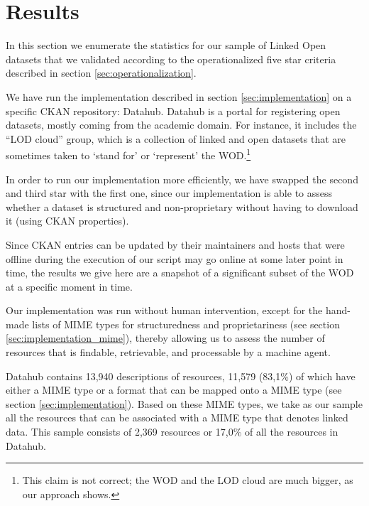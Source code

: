 \section{Results}
\label{sec:results}

In this section we enumerate the statistics for our sample of
 Linked Open datasets that we validated according to
 the operationalized five star criteria described in
 section \ref{sec:operationalization}.

We have run the implementation described in section \ref{sec:implementation}
 on a specific CKAN repository: Datahub.
Datahub is a portal for registering open datasets,
 mostly coming from the academic domain.
For instance, it includes the ``LOD cloud'' group,
 which is a collection of linked and open datasets
 that are sometimes taken to `stand for' or `represent'
 the WOD.\footnote{This claim is not correct;
  the WOD and the LOD cloud are much bigger, as our approach shows.}

In order to run our implementation more efficiently,
 we have swapped the second and third star with the first one,
 since our implementation is able to assess whether a dataset
 is structured and non-proprietary without having to download it
 (using CKAN properties).

Since CKAN entries can be updated by their maintainers and
 hosts that were offline during the execution of our \obs script
 may go online at some later point in time,
 the results we give here are a snapshot of a significant subset
 of the WOD at a specific moment in time.

Our implementation was run without human intervention,
 except for the hand-made lists of MIME types
 for structuredness and proprietariness
 (see section \ref{sec:implementation_mime}),
 thereby allowing us to assess the number of resources
 that is findable, retrievable, and processable by a machine agent.


Datahub contains 13,940 descriptions of resources,
 11,579 (83,1\%) of which have either a MIME type or
 a format that can be mapped onto a MIME type
 (see section \ref{sec:implementation}).
Based on these MIME types, we take as our sample all the resources
 that can be associated with a MIME type that denotes linked data.
This sample consists of 2,369 resources or 17,0\% of all the resources
 in Datahub.

